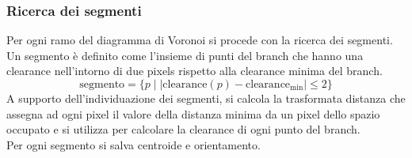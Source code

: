 \subsubsection{Ricerca dei segmenti}
Per ogni ramo del diagramma di Voronoi si procede con la ricerca dei segmenti. \\
Un segmento è definito come l'insieme di punti del branch che hanno una clearance nell'intorno di due pixels rispetto alla clearance minima del branch.
\begin{equation}
  \text{segmento} = \{p \mid | \text{clearance}(p) - \text{clearance}_{\text{min}} | \leq 2\}
\end{equation}
A supporto dell'individuazione dei segmenti, si calcola la trasformata distanza che assegna ad ogni pixel il valore della distanza minima da un pixel dello spazio occupato e si utilizza per calcolare la clearance di ogni punto del branch.\\Per ogni segmento si salva centroide e orientamento.
